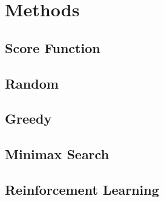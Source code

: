 \section{Methods}

\subsection{Score Function}
\label{score function}

\subsection{Random}

\subsection{Greedy}

\subsection{Minimax Search}

\subsection{Reinforcement Learning}
